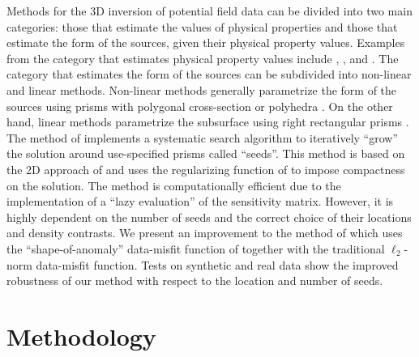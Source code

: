 \documentclass{segabs}
\begin{document}
\begin{sloppypar}
Methods for the 3D inversion of potential field data can be divided into two
main categories: those that estimate the values of physical properties and those
that estimate the form of the sources, given their physical property values.
Examples from the category that estimates physical property values
include \citet{Bear1995}, \citet{Li1998a}, and \citet{Portniaguine1999}.
The category that estimates the form of the sources can be subdivided into
non-linear and linear methods.
Non-linear methods generally parametrize the form of the sources using prisms
with polygonal cross-section \citep[e.g.,][]{Radhakrishna1996, OliveiraJr2011}
or polyhedra \citep[e.g.,][]{Wildman2009}.
On the other hand, linear methods parametrize the subsurface using right
rectangular prisms \citep[e.g.,][]{Camacho2000, Krahenbuhl2006, SilvaDias2009,
SilvaDias2011, Uieda2011}.
The method of \citet{Uieda2011} implements a systematic search algorithm to
iteratively ``grow'' the solution around use-specified prisms called ``seeds''.
This method is based on the 2D approach of \citet{Rene1986} and uses the
regularizing function of \citet{SilvaDias2009} to impose compactness on the
solution.
The method is computationally efficient due to the implementation of a ``lazy
evaluation'' of the sensitivity matrix.
However, it is highly dependent on the number of seeds and the correct choice
of their locations and density contrasts.
We present an improvement to the method of \citet{Uieda2011} which uses the
``shape-of-anomaly'' data-misfit function of \citet{Rene1986} together with the
traditional $\ell_{2}$-norm data-misfit function.
Tests on synthetic and real data show the improved robustness of our method with
respect to the location and number of seeds.
\end{sloppypar}

\section{Methodology}
\end{document}
